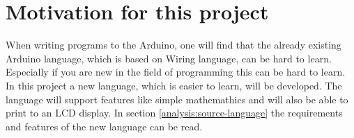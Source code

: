 \section{Motivation for this project}\label{introduction:motivation}
When writing programs to the Arduino, one will find that the already existing Arduino language, which is based on Wiring language, can be hard to learn. Especially if you are new in the field of programming this can be hard to learn. In this project a new language, which is easier to learn, will be developed. The language will support features like simple mathemathics and will also be able to print to an LCD display. In section \ref{analysis:source-language} the requirements and features of the new language can be read.

